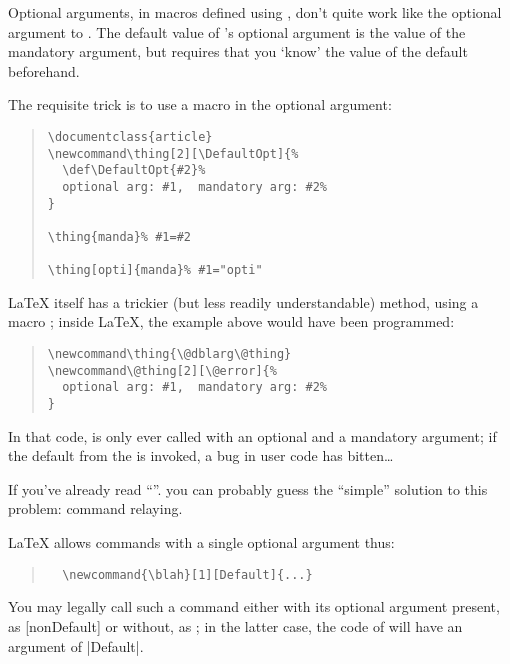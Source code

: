 
Optional arguments, in macros defined using , don't
quite work like the optional argument to .  The default
value of 's optional argument is the value of the
mandatory argument, but  requires that you `know' the
value of the default beforehand.

The requisite trick is to use a macro in the optional argument:
\begin{quote}
\begin{verbatim}
\documentclass{article}
\newcommand\thing[2][\DefaultOpt]{%
  \def\DefaultOpt{#2}%
  optional arg: #1,  mandatory arg: #2%
}

\thing{manda}% #1=#2

\thing[opti]{manda}% #1="opti"

\end{verbatim}
\end{quote}
\LaTeX{} itself has a trickier (but less readily understandable)
method, using a macro ; inside \LaTeX{}, the example
above would have been programmed:
\begin{quote}
\begin{verbatim}
\newcommand\thing{\@dblarg\@thing}
\newcommand\@thing[2][\@error]{%
  optional arg: #1,  mandatory arg: #2%
}
\end{verbatim}
\end{quote}
In that code,  is only ever called with an optional and a
mandatory argument; if the default from the  is
invoked, a bug in user code has bitten\dots{}


If you've already read %
``''.
you can probably guess the ``simple'' solution to this problem:
command relaying.

\LaTeX{} allows commands with a single optional argument thus:
\begin{quote}
\begin{verbatim}
  \newcommand{\blah}[1][Default]{...}
\end{verbatim}
\end{quote}

You may legally call such a command either with its optional argument
present, as
[nonDefault] or without, as ; in the latter
case, the code of  will have an argument of |Default|.

